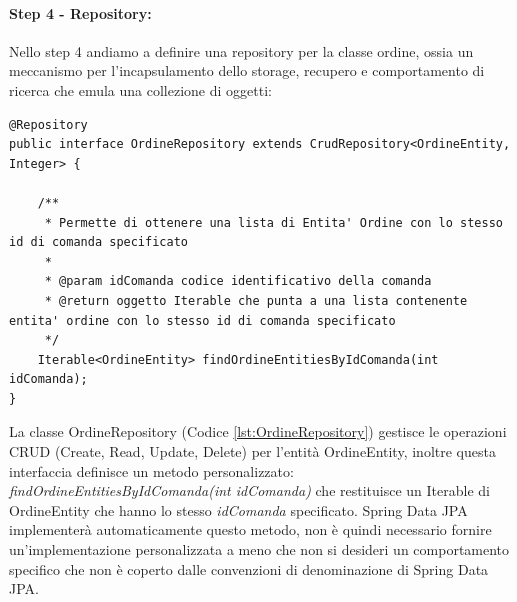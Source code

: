 \paragraph{Step 4 - Repository:}
Nello step 4 andiamo a definire una repository per la classe ordine, ossia un meccanismo per l’incapsulamento dello storage, recupero e comportamento di ricerca che emula una collezione di oggetti:
\begin{lstlisting}[style=myJava, 
    caption={Classe repository OrdineRepository.java}, label=lst:OrdineRepository]
@Repository
public interface OrdineRepository extends CrudRepository<OrdineEntity, Integer> {

    /**
     * Permette di ottenere una lista di Entita' Ordine con lo stesso id di comanda specificato
     *
     * @param idComanda codice identificativo della comanda
     * @return oggetto Iterable che punta a una lista contenente entita' ordine con lo stesso id di comanda specificato
     */
    Iterable<OrdineEntity> findOrdineEntitiesByIdComanda(int idComanda);
}
\end{lstlisting}
La classe OrdineRepository (Codice \vref{lst:OrdineRepository}) gestisce le operazioni CRUD (Create, Read, Update, Delete) per l’entità OrdineEntity, inoltre questa interfaccia definisce un metodo personalizzato:
\textit{findOrdineEntitiesByIdComanda(int idComanda)} che restituisce un Iterable di OrdineEntity che hanno lo stesso \textit{idComanda} specificato.
Spring Data JPA implementerà automaticamente questo metodo, non è quindi necessario fornire un’implementazione personalizzata a meno che non si desideri un comportamento specifico che non è coperto dalle convenzioni di denominazione di Spring Data JPA.
